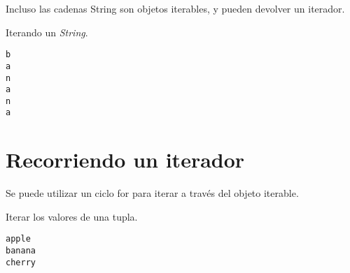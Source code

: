 Incluso las cadenas String son objetos iterables, y pueden devolver un
iterador.

\begin{code} Iterando un \textit{String}.
\begin{Shaded}
\begin{Highlighting}[]
\OperatorTok{=} 
\OperatorTok{=} 

\NormalTok{(}
\NormalTok{(}
\NormalTok{(}
\NormalTok{(}
\NormalTok{(}
\NormalTok{(}
\end{Highlighting}
\end{Shaded}

\begin{verbatim}
b
a
n
a
n
a
\end{verbatim}
\end{code}

\section{Recorriendo un iterador}

Se puede utilizar un ciclo for para iterar a través del objeto iterable. \\

\begin{code} Iterar los valores de una tupla.

\begin{Shaded}
\begin{Highlighting}[]
\OperatorTok{=}\NormalTok{ (}\NormalTok{, }\NormalTok{, }\NormalTok{)}

\end{Highlighting}
\end{Shaded}

\begin{verbatim}
apple
banana
cherry

\end{verbatim}
\end{code}


